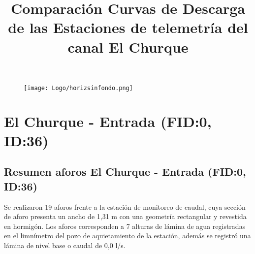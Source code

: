 \documentclass[]{article}
\title{Comparación Curvas de Descarga de las Estaciones de telemetría del canal El Churque}
\author{}
\date{}
\begin{document}
\sloppy 

\begin{titlepage}

\begin{figure}
 \centering \vspace*{1.5in}
  \texttt{[image: Logo/horizsinfondo.png]}
  \vspace*{1in}
\end{figure}
\maketitle \thispagestyle{empty} \vspace*{3in}
\begin{center}
    \fontsize{14}{0} \selectfont{Marzo 2018}
\end{center}

\end{titlepage}

\section{El Churque - Entrada (FID:0, ID:36)}\label{ID:36}

\subsection{Resumen aforos El Churque - Entrada (FID:0, ID:36)}\label{aforos ID:36}

Se realizaron 19 aforos frente a la estación de monitoreo de caudal, cuya sección de aforo presenta un ancho de 1,31 m con una geometría rectangular y revestida en hormigón. Los aforos corresponden a 7 alturas de lámina de agua registradas en el limnímetro del pozo de aquietamiento de la estación, además se registró una lámina de nivel base o caudal de 0,0 l/s.
\end{document}
